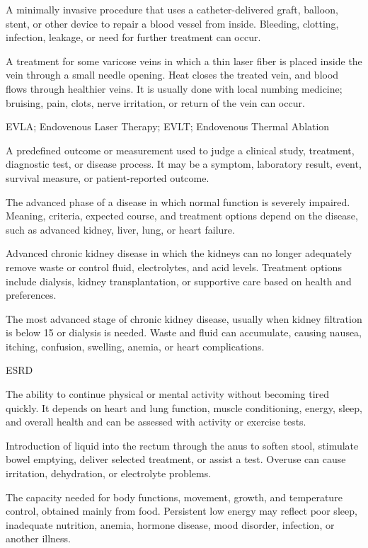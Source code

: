  A minimally invasive procedure that uses a catheter-delivered graft, balloon, stent, or other device to repair a blood vessel from inside. Bleeding, clotting, infection, leakage, or need for further treatment can occur.

 A treatment for some varicose veins in which a thin laser fiber is placed inside the vein through a small needle opening. Heat closes the treated vein, and blood flows through healthier veins. It is usually done with local numbing medicine; bruising, pain, clots, nerve irritation, or return of the vein can occur.

\synonyms
EVLA; Endovenous Laser Therapy; EVLT; Endovenous Thermal Ablation

 A predefined outcome or measurement used to judge a clinical study, treatment, diagnostic test, or disease process. It may be a symptom, laboratory result, event, survival measure, or patient-reported outcome.

 The advanced phase of a disease in which normal function is severely impaired. Meaning, criteria, expected course, and treatment options depend on the disease, such as advanced kidney, liver, lung, or heart failure.

 Advanced chronic kidney disease in which the kidneys can no longer adequately remove waste or control fluid, electrolytes, and acid levels. Treatment options include dialysis, kidney transplantation, or supportive care based on health and preferences.

 The most advanced stage of chronic kidney disease, usually when kidney filtration is below 15 or dialysis is needed. Waste and fluid can accumulate, causing nausea, itching, confusion, swelling, anemia, or heart complications.

\synonyms
ESRD

 The ability to continue physical or mental activity without becoming tired quickly. It depends on heart and lung function, muscle conditioning, energy, sleep, and overall health and can be assessed with activity or exercise tests.

 Introduction of liquid into the rectum through the anus to soften stool, stimulate bowel emptying, deliver selected treatment, or assist a test. Overuse can cause irritation, dehydration, or electrolyte problems.

 The capacity needed for body functions, movement, growth, and temperature control, obtained mainly from food. Persistent low energy may reflect poor sleep, inadequate nutrition, anemia, hormone disease, mood disorder, infection, or another illness.

